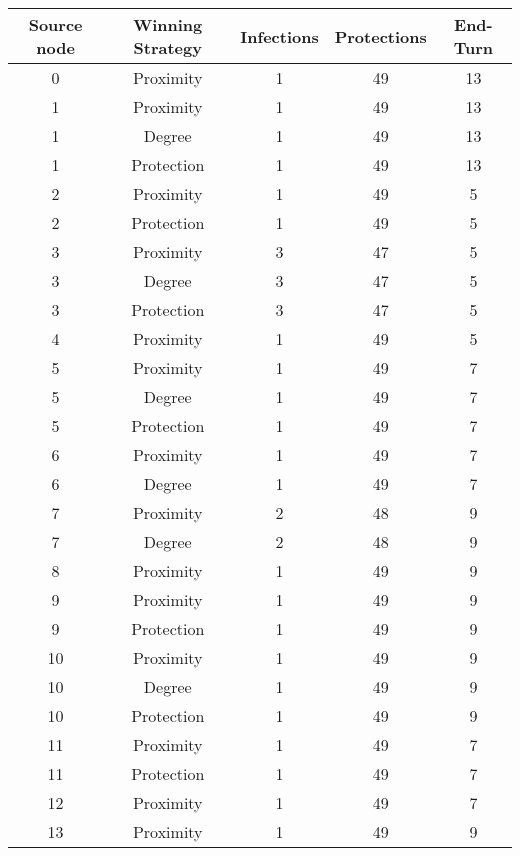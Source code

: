 \documentclass[results.tex]{subfiles}
\begin{document}
\begin{center}
  \begin{tabular}{| c || c | c | c | c |}
    \hline
    {\bfseries Source node} & {\bfseries Winning Strategy} & {\bfseries Infections} & {\bfseries Protections} & {\bfseries End-Turn} \\  %
    \hline\hline
    0 & Proximity & 1 & 49 & 13 \\ 
    \hline
    1 & Proximity & 1 & 49 & 13 \\ 
    \hline
    1 & Degree & 1 & 49 & 13 \\ 
    \hline
    1 & Protection & 1 & 49 & 13 \\ 
    \hline
    2 & Proximity & 1 & 49 & 5 \\ 
    \hline
    2 & Protection & 1 & 49 & 5 \\ 
    \hline
    3 & Proximity & 3 & 47 & 5 \\ 
    \hline
    3 & Degree & 3 & 47 & 5 \\ 
    \hline
    3 & Protection & 3 & 47 & 5 \\ 
    \hline
    4 & Proximity & 1 & 49 & 5 \\ 
    \hline
    5 & Proximity & 1 & 49 & 7 \\ 
    \hline
    5 & Degree & 1 & 49 & 7 \\ 
    \hline
    5 & Protection & 1 & 49 & 7 \\ 
    \hline
    6 & Proximity & 1 & 49 & 7 \\ 
    \hline
    6 & Degree & 1 & 49 & 7 \\ 
    \hline
    7 & Proximity & 2 & 48 & 9 \\ 
    \hline
    7 & Degree & 2 & 48 & 9 \\ 
    \hline
    8 & Proximity & 1 & 49 & 9 \\ 
    \hline
    9 & Proximity & 1 & 49 & 9 \\ 
    \hline
    9 & Protection & 1 & 49 & 9 \\ 
    \hline
    10 & Proximity & 1 & 49 & 9 \\ 
    \hline
    10 & Degree & 1 & 49 & 9 \\ 
    \hline
    10 & Protection & 1 & 49 & 9 \\ 
    \hline
    11 & Proximity & 1 & 49 & 7 \\ 
    \hline
    11 & Protection & 1 & 49 & 7 \\ 
    \hline
    12 & Proximity & 1 & 49 & 7 \\ 
    \hline
    13 & Proximity & 1 & 49 & 9 \\ 

\end{tabular}
\end{center}
\end{document}
